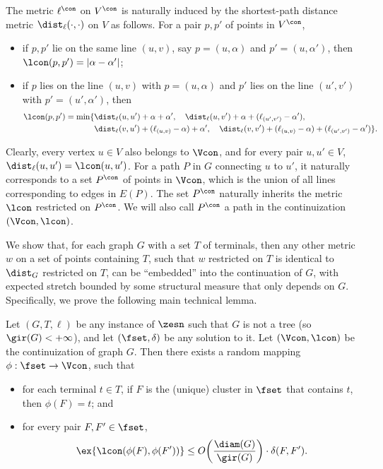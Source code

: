 The metric $\ell^{\con}$ on $V^{\con}$ is naturally induced by the shortest-path distance metric $\dist_{\ell}(\cdot,\cdot)$ on $V$ as follows.
For a pair $p,p'$ of points in $V^{\con}$, 
\begin{itemize}
\item if $p,p'$ lie on the same line $(u,v)$, say $p=(u,\alpha)$ and $p'=(u,\alpha')$, then $\lcon(p,p')=|\alpha-\alpha'|$;
\item if $p$ lies on the line $(u,v)$ with $p=(u,\alpha)$ and $p'$ lies on the line $(u',v')$ with $p'=(u',\alpha')$, then 
\[
\begin{split}
\lcon(p,p')=\min\{
&  \dist_{\ell}(u,u')+\alpha+\alpha', \quad
	\dist_{\ell}(u,v')+\alpha+(\ell_{(u',v')}-\alpha'),\\
&	\dist_{\ell}(v,u')+(\ell_{(u,v)}-\alpha)+\alpha', \quad
	\dist_{\ell}(v,v')+(\ell_{(u,v)}-\alpha)+(\ell_{(u',v')}-\alpha')
\}.
\end{split}
\]
\end{itemize}
Clearly, every vertex $u\in V$ also belongs to $\Vcon$, and for every pair $u,u'\in V$, $\dist_{\ell}(u,u')=\lcon(u,u')$.
For a path $P$ in $G$ connecting $u$ to $u'$, it naturally corresponds to a set $P^{\con}$ of points in $\Vcon$, which is the union of all lines corresponding to edges in $E(P)$. The set $P^{\con}$ naturally inherits the metric $\lcon$ restricted on $P^{\con}$. We will also call $P^{\con}$ a path in the continuization $(\Vcon,\lcon)$.

We show that, for each graph $G$ with a set $T$ of terminals, then any other metric $w$ on a set of points containing $T$, such that $w$ restricted on $T$ is identical to $\dist_{G}$ restricted on $T$, can be ``embedded'' into the continuation of $G$, with expected stretch bounded by some structural measure that only depends on $G$. 
Specifically, we prove the following main technical lemma.


\begin{lemma} \label{lem:d-g}
Let $(G,T,\ell)$ be any instance of $\zesn$ such that $G$ is not a tree (so $\gir(G)<+\infty$), and let $(\fset,\delta)$ be any solution to it. Let $(\Vcon,\lcon)$ be the continuization of graph $G$.
Then there exists a random mapping $\phi: \fset \to \Vcon$, such that
\begin{itemize}
\item for each terminal $t\in T$, if $F$ is the (unique) cluster in $\fset$ that contains $t$, then $\phi(F)=t$; and
\item for every pair $F,F'\in \fset$,
$$\ex{\lcon(\phi(F),\phi(F'))} \le O\bigg(\frac{\diam(G)}{\gir(G)}\bigg)\cdot  \delta(F,F').$$
\end{itemize}
\end{lemma}


